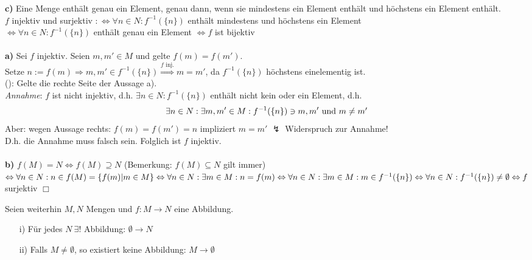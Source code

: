 \begin{bew}
	\textbf{c)} Eine Menge enthält genau ein Element, genau dann, wenn sie mindestens ein Element enthält und höchstens ein Element enthält.\\
	$f$ injektiv und surjektiv $:\Leftrightarrow \forall n\in N:f^{-1}(\{n\})$ enthält mindestens und höchstens ein Element \\
	$\Leftrightarrow\forall n\in N:f^{-1}(\{n\})$ enthält genau ein Element $\Leftrightarrow f$ ist bijektiv \\
	\\
	\textbf{a)} \anf{$\Rightarrow$} Sei $f$ injektiv. Seien $m,m'\in M$ und gelte $f(m)=f(m')$.\\
	Setze $n:=f(m)\Rightarrow m,m'\in f^{-1}(\{n\}) \stackrel{f\text{ inj.}}{\Rightarrow}m=m'$, da $f^{-1}(\{n\})$ höchstens einelementig ist. \\
	\anf{$\Leftarrow$} (): Gelte die rechte Seite der Aussage a).\\
	\textit{Annahme}: $f$ ist nicht injektiv, d.h. $\exists n\in N: f^{-1}(\{n\})$ enthält nicht kein oder ein Element, d.h.
	\[ \exists n\in N:\exists m,m'\in M:f^{-1}(\{n\})\ni m,m'$ und $m\neq m'\]
	Aber: wegen Aussage rechts: $f(m)=f(m')=n$ impliziert $m=m'$ \hfill {\Large$\lightning$} Widerspruch zur Annahme!\\
	D.h. die Annahme muss falsch sein. Folglich ist $f$ injektiv.\\
	\\
	\textbf{b)} $f(M)=N\Leftrightarrow f(M)\supseteq N$ (Bemerkung: $f(M)\subseteq N$ gilt immer)\\
	$\Leftrightarrow \forall n\in N:n\in f(M)=\{f(m)|m\in M\} \Leftrightarrow \forall n\in N:\exists m\in M:n=f(m)\\
	\Leftrightarrow\forall n\in N:\exists m\in M:m\in f^{-1}(\{n\})\Leftrightarrow\forall n\in N:f^{-1}(\{n\})\neq\emptyset\Leftrightarrow f$ surjektiv \hfill $\Box$\\
\end{bew}

\noindent Seien weiterhin $M,N$ Mengen und $f:M\rightarrow N$ eine Abbildung.
\begin{bem}
	\begin{itemize}
		\item[]
		\item[i)] Für jedes $N\:\exists !$ Abbildung: $\emptyset\rightarrow N$
		\item[ii)] Falls $M\neq\emptyset$, so existiert keine Abbildung: $M\rightarrow\emptyset$
	\end{itemize}
\end{bem}

